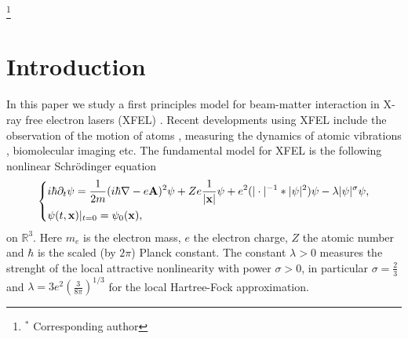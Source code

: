 \documentclass[10pt, leqno]{amsart}
\newcommand{\beq}{\begin{equation}}
\newcommand{\ee}{\end{equation}}
\newcommand{\xb}{\boldsymbol{\rm{x}}}
\newcommand{\Ab}{\boldsymbol{\rm{A}}}
\def\d{{\partial}}
\begin{document}
\thanks{$^*$ Corresponding author}
\begin{abstract}
We study a nonlinear Schr\"odinger equation which arises as an effective single particle
model in X-ray Free Electron Lasers (XFEL). This equation appears as a first-principles
model for the beam-matter interactions that would take place in an XFEL molecular imaging
experiment in \cite{frat1}. Since XFEL is more powerful by several orders of magnitude
than more conventional lasers, the systematic investigation of many of the standard
assumptions and approximations has attracted increased attention.

In this model the electrons move under a rapidly oscillating electromagnetic
field,  and the convergence of the problem to an effective time-averaged one is examined.
We use an operator splitting pseudo-spectral method to investigate numerically the
behaviour of the model versus its time-averaged version in complex situations, namely the
energy subcritical/mass supercritical case, and in the presence of a periodic lattice.

We find the time averaged model to be an effective approximation, even close to blowup,
for fast enough oscillations of the external field. This work extends previous analytical
results for simpler cases \cite{xfel1}.
\end{abstract}
%
 
\maketitle
%
%
\tableofcontents

\newpage




\section{Introduction}

In this paper we study a first principles model for beam-matter interaction in X-ray free
electron lasers (XFEL) \cite{Ch,frat1}. Recent developments using XFEL include the
observation of the motion of atoms \cite{Br}, measuring the dynamics of atomic vibrations
\cite{Fri}, biomolecular imaging \cite{Neu} etc. The fundamental model for XFEL is the
following nonlinear Schr\"odinger equation 
\beq \label{eq000} \left\{ \begin{aligned}
&i\hbar\d_t\psi=\frac{1}{2m}(i\hbar\nabla-e\Ab)^2\psi+Ze\frac{1}{|\xb|}\psi+e^2(|\cdot|^{-
1}\ast|\psi|^2)\psi -\lambda|\psi|^\sigma\psi,\\ &\psi(t,\xb)|_{t=0}=\psi_0(\xb),
\end{aligned}\right. \ee 
on $\mathbb{R}^3$. Here $m_e$ is the electron mass, $e$ the
electron charge, $Z$ the atomic number and $\hbar$ is the scaled (by $2\pi$) Planck
constant.  The constant $\lambda>0$ measures the strenght of the local attractive
nonlinearity with power $\sigma>0$, in particular $\sigma=\frac{2}{3}$ and
$\lambda=3e^2\left(\frac{3}{8\pi}\right)^{1/3}$ for the local Hartree-Fock approximation.
\end{document}
